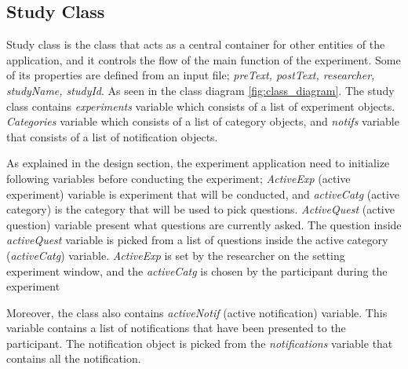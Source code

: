 \subsection{Study Class}
Study class is the class that acts as a central container for other entities of the application, and it controls the flow of the main function of the experiment.
Some of its properties are defined from an input file; \textit{preText, postText, researcher, studyName, studyId}.
As seen in the class diagram \ref{fig:class_diagram}. The study class contains \textit{experiments} variable which consists of a list of experiment objects.
 \textit{Categories} variable which consists of a list of category objects, and \textit{notifs} variable that consists of a list of notification objects.

As explained in the design section, the experiment application need to initialize following variables before conducting the experiment;
\textit{ActiveExp} (active experiment) variable is experiment that will be conducted, and \textit{activeCatg} (active category) is the
category that will be used to pick questions.
\textit{ActiveQuest} (active question) variable present what questions are currently asked.
The question inside \textit{activeQuest} variable is picked from a list of questions inside the active category (\textit{activeCatg}) variable.
\textit{ActiveExp} is set by the researcher on the setting experiment window, and the \textit{activeCatg} is chosen by the participant during the experiment




Moreover, the class also contains \textit{activeNotif} (active notification) variable.
This variable contains a list of notifications that have been presented to the participant.
The notification object is picked from the \textit{notifications} variable that contains all the notification.


